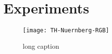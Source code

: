 \chapter{Experiments}\label{ch:experiments}

\Blindtext

\begin{sidewaysfigure}
	\texttt{[image: TH-Nuernberg-RGB]}
	\caption[short text]{long caption}
\end{sidewaysfigure}